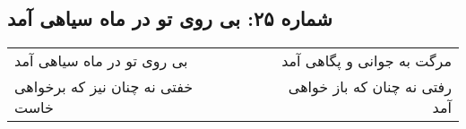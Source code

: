 \begin{center}
\section*{شماره ۲۵: بی روی تو در ماه سیاهی آمد}
\label{sec:025}
\begin{longtable}{l p{0.5cm} r}
بی روی تو در ماه سیاهی آمد
&&
مرگت به جوانی و پگاهی آمد
\\
خفتی نه چنان نیز که برخواهی خاست
&&
رفتی نه چنان که باز خواهی آمد
\\
\end{longtable}
\end{center}
